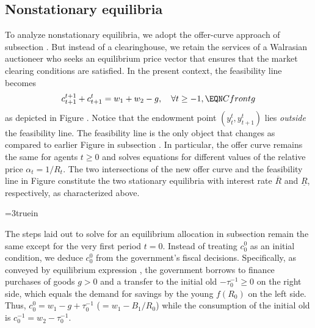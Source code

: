 \subsection{Nonstationary equilibria}\label{sec:DefBnonstat}%
To analyze nonstationary equilibria, we adopt the offer-curve 
approach of subsection . But instead of
a clearinghouse, we retain the services of  a Walrasian auctioneer
who seeks an equilibrium price vector that ensures that the market 
clearing conditions  are satisfied. In the
present context, the feasibility line 
becomes
$$c_{t+1}^{t+1} + c_{t+1}^t 
     = w_1 + w_2 -g , \quad \forall t \geq -1,   \EQN Cfrontg
$$
as depicted in Figure . Notice that the endowment point 
$(y^t_t, y^t_{t+1})$ lies {\it outside} the feasibility line.
The feasibility line 
is the only object that changes as compared to earlier 
Figure  in subsection . In 
particular, the offer curve remains the same for agents $t\geq 0$ 
and solves equations  for different values of
the relative price $\alpha_t = 1/ R_t$. The two intersections
of the new offer curve and the feasibility line in 
Figure  constitute the two stationary equilibria 
with interest rate $\overline R$ and $\underline R$, respectively,
as characterized above.


\centerline{\epsfxsize=3truein}
\caption{Equilibria with debt- or money-financed government deficit finance.}
\endfigure

The steps laid out to solve for an equilibrium
allocation in subsection  remain
the same except for the very first period $t=0$.
Instead of treating $c^0_0$ as an initial condition,
we deduce $c^0_0$ from the government's fiscal decisions.
Specifically, as conveyed by  
equilibrium expression ,  
the government borrows to finance purchases of 
goods $g>0$ and a transfer to the initial old  
$-\tau^{-1}_0\geq 0$ on the right side, which equals
the demand for savings by the young $f(R_0)$
on the left side. Thus, 
$c^0_0 = w_1 -g + \tau^{-1}_0$ ($=w_1 - B_1/R_0$)
while the consumption of the initial old
is $c^{-1}_0 = w_2 - \tau^{-1}_0$.

